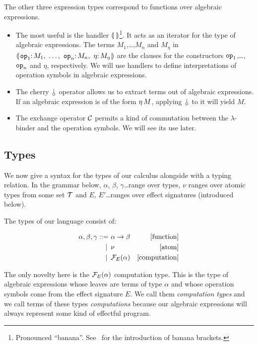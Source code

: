 \documentclass{llncs}
\begin{document}
The other three expression types correspond to functions over algebraic
expressions.
\begin{itemize}
\item The most useful is the handler $\llparenthesis \,  \, \rrparenthesis$\footnote{Pronounced
  ``banana''. See~\cite{meijer1991functional} for the introduction of
  banana brackets.}. It acts as an iterator for the type of algebraic
  expressions. The terms $M_1$,\ldots,$M_n$ and $M_\eta$ in $\cdbanana$ are
  the clauses for the constructors $\mathtt{op}_1$,\ldots,$\mathtt{op}_n$ and
  $\eta$, respectively. We will use handlers to define interpretations of
  operation symbols in algebraic expressions.
\item The cherry $\cherry$ operator allows us to extract terms out of
  algebraic expressions. If an algebraic expression is of the form
  $\eta\,M$, applying $\cherry$ to it will yield $M$.
\item The exchange operator $\mathcal{C}$ permits a kind of commutation between the
  $\lambda$-binder and the operation symbols. We will see its use later.
\end{itemize}


\subsection{Types}
\label{ssec:types}

We now give a syntax for the types of our calculus alongside with a typing
relation. In the grammar below, $\alpha$, $\beta$, $\gamma$\ldots range
over types, $\nu$ ranges over atomic types from some set $\mathcal{T}$ and $E$,
$E'$\ldots ranges over effect signatures (introduced below).

The types of our language consist of:

\begin{align*}
  \alpha, \beta, \gamma ::= &\ \alpha \to \beta & \mbox{[function]} \\
   | \, &\ \nu & \mbox{[atom]} \\
   | \, &\ \mathcal{F}_E(\alpha) & \mbox{[computation]}
\end{align*}

The only novelty here is the $\mathcal{F}_E(\alpha)$ computation type. This is the
type of algebraic expressions whose leaves are terms of type $\alpha$ and
whose operation symbols come from the effect signature $E$. We call them
\emph{computation types} and we call terms of these types
\emph{computations} because our algebraic expressions will always represent
some kind of effectful program.
\end{document}
